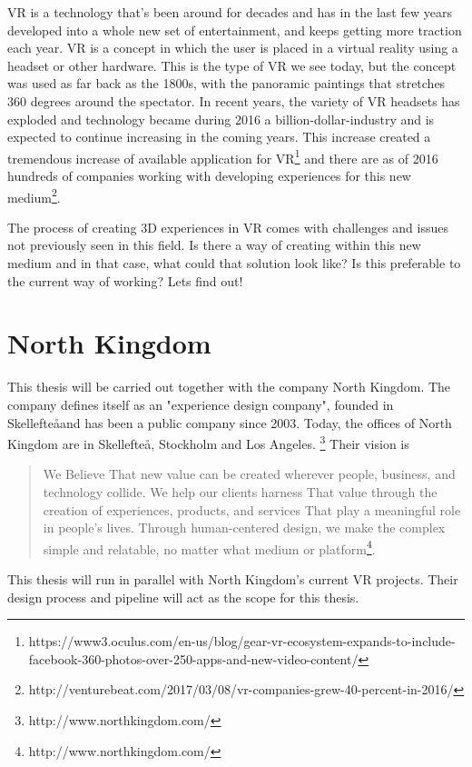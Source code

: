 VR is a technology that's been around for decades and has in the last few years developed into a whole new set of entertainment, and keeps getting more traction each year\cite{VR:mazuryk1996virtual}. VR is a concept in which the user is placed in a virtual reality using a headset or other hardware. This is the type of VR we see today, but the concept was used  as far back as the 1800s, with the panoramic paintings that stretches 360 degrees around the spectator. In recent years, the variety of VR headsets has exploded and technology became during 2016 a billion-dollar-industry and is expected to continue increasing in the coming years\cite{VR_stats:statista}.
This increase created a tremendous increase of available application for VR\footnote{https://www3.oculus.com/en-us/blog/gear-vr-ecosystem-expands-to-include-facebook-360-photos-over-250-apps-and-new-video-content/} and there are as of 2016 hundreds of companies working with developing experiences for this new medium\footnote{http://venturebeat.com/2017/03/08/vr-companies-grew-40-percent-in-2016/}.

The process of creating 3D experiences in VR comes with challenges and issues not previously seen in this field. Is there a way of creating within this new medium and in that case, what could that solution look like? Is this preferable to the current way of working? Lets find out!

\section{North Kingdom}
This thesis will be carried out together with the company North Kingdom. The company defines itself as an "experience design company", founded in Skellefte\aa and has been a public company since 2003. Today, the offices of North Kingdom are in Skellefte\aa, Stockholm and Los Angeles. \footnote{http://www.northkingdom.com/} Their vision is
\begin{quote}
We Believe That new value can be created wherever people, business, and technology collide. We help our clients harness That value through the creation of experiences, products, and services That play a meaningful role in people's lives. Through human-centered design, we make the complex simple and relatable, no matter what medium or platform\footnote{http://www.northkingdom.com/}.
\end{quote}
This thesis will run in parallel with North Kingdom's current VR projects. Their design process and pipeline will act as the scope for this thesis.
